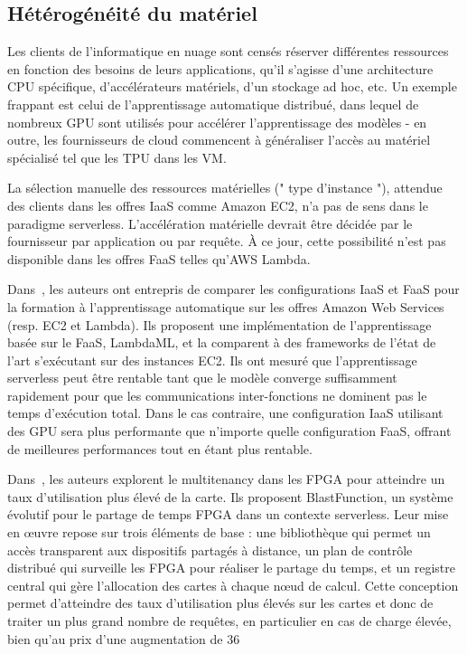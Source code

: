 \subsection{Hétérogénéité du matériel}

Les clients de l'informatique en nuage sont censés réserver différentes ressources en fonction des besoins de leurs applications, qu'il s'agisse d'une architecture CPU spécifique, d'accélérateurs matériels, d'un stockage ad hoc, etc. Un exemple frappant est celui de l'apprentissage automatique distribué, dans lequel de nombreux GPU sont utilisés pour accélérer l'apprentissage des modèles - en outre, les fournisseurs de cloud commencent à généraliser l'accès au matériel spécialisé tel que les TPU dans les VM.

La sélection manuelle des ressources matérielles (" type d'instance "), attendue des clients dans les offres IaaS comme Amazon EC2, n'a pas de sens dans le paradigme serverless. L'accélération matérielle devrait être décidée par le fournisseur par application ou par requête. À ce jour, cette possibilité n'est pas disponible dans les offres FaaS telles qu'AWS Lambda.

Dans~\cite{Jiang2021TowardsDS}, les auteurs ont entrepris de comparer les configurations IaaS et FaaS pour la formation à l'apprentissage automatique sur les offres Amazon Web Services (resp. EC2 et Lambda). Ils proposent une implémentation de l'apprentissage basée sur le FaaS, LambdaML, et la comparent à des frameworks de l'état de l'art s'exécutant sur des instances EC2. Ils ont mesuré que l'apprentissage serverless peut être rentable tant que le modèle converge suffisamment rapidement pour que les communications inter-fonctions ne dominent pas le temps d'exécution total. Dans le cas contraire, une configuration IaaS utilisant des GPU sera plus performante que n'importe quelle configuration FaaS, offrant de meilleures performances tout en étant plus rentable.

Dans~\cite{bacisBlastFunctionFPGAasaServiceSystem2020}, les auteurs explorent le multitenancy dans les FPGA pour atteindre un taux d'utilisation plus élevé de la carte. Ils proposent BlastFunction, un système évolutif pour le partage de temps FPGA dans un contexte serverless. Leur mise en œuvre repose sur trois éléments de base : une bibliothèque qui permet un accès transparent aux dispositifs partagés à distance, un plan de contrôle distribué qui surveille les FPGA pour réaliser le partage du temps, et un registre central qui gère l'allocation des cartes à chaque nœud de calcul. Cette conception permet d'atteindre des taux d'utilisation plus élevés sur les cartes et donc de traiter un plus grand nombre de requêtes, en particulier en cas de charge élevée, bien qu'au prix d'une augmentation de 36%

